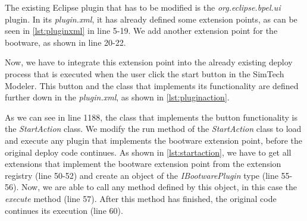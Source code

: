 The existing Eclipse plugin that has to be modified is the \textit{org.eclipse.bpel.ui} plugin.
In its \textit{plugin.xml}, it has already defined some extension points, as can be seen in \autoref{lst:pluginxml} in line 5-19.
We add another extension point for the bootware, as shown in line 20-22.

\vspace*{\baselineskip}

Now, we have to integrate this extension point into the already existing deploy process that is executed when the user click the start button in the SimTech Modeler.
This button and the class that implements its functionality are defined further down in the \textit{plugin.xml}, as shown in \autoref{lst:pluginaction}.

\vspace*{\baselineskip}

As we can see in line 1188, the class that implements the button functionality is the \textit{StartAction} class.
We modify the run method of the \textit{StartAction} class to load and execute any plugin that implements the bootware extension point, before the original deploy code continues.
As shown in \autoref{lst:startaction}, we have to get all extensions that implement the bootware extension point from the extension registry (line 50-52) and create an object of the \textit{IBootwarePlugin} type (line 55-56).
Now, we are able to call any method defined by this object, in this case the \textit{execute} method (line 57).
After this method has finished, the original code continues its execution (line 60).

\vspace*{\baselineskip}

